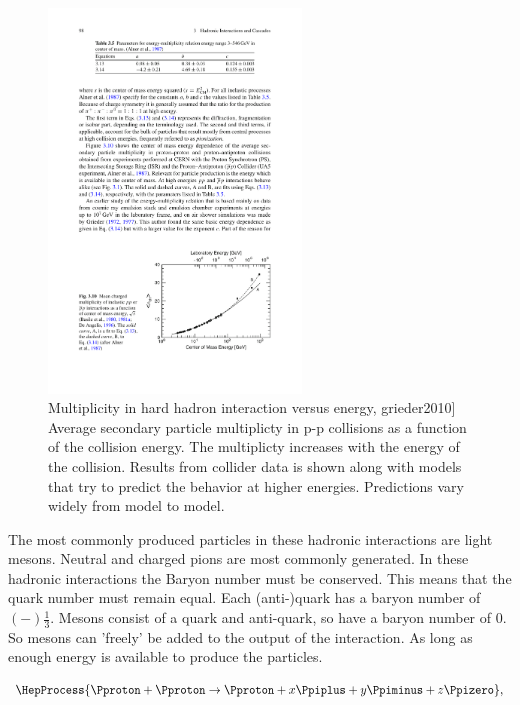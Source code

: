 \begin{figure}
    \centering
    \includegraphics[width=0.6\textwidth]
                    {plots/cosmic-rays/multiplicity}
    \caption{Multiplicity in hard hadron interaction versus energy, grieder2010]
Average secondary particle multiplicty in p-p collisions as a function of the collision energy. The multiplicty increases with the energy of the collision. Results from collider data is shown along with models that try to predict the behavior at higher energies. Predictions vary widely from model to model.}
    \label{fig:multiplicity}
\end{figure}

The most commonly produced particles in these hadronic interactions are light mesons. Neutral and charged pions are most commonly generated. In these hadronic interactions the Baryon number must be conserved. This means that the quark number must remain equal. Each (anti-)quark has a baryon number of $(-)\frac{1}{3}$. Mesons consist of a quark and anti-quark, so have a baryon number of 0. So mesons can 'freely' be added to the output of the interaction. As long as enough energy is available to produce the particles.

\begin{equation}
\HepProcess{\Pproton + \Pproton \to \Pproton + x \Ppiplus + y \Ppiminus + z \Ppizero},
\end{equation}

